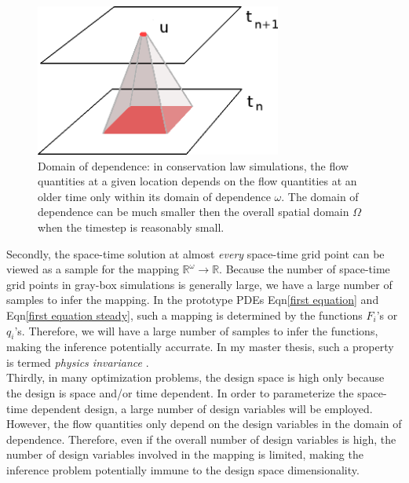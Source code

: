 \documentclass[a4paper,onecolumn]{article}
\theoremstyle{remark}
\begin{document}
\begin{figure}[H]\begin{center}
    \includegraphics[height=5cm]{locality.png}
    \caption{Domain of dependence: in conservation law simulations,
             the flow quantities at a given location
             depends on the flow quantities at an older time only within its
             domain of dependence $\omega$. The domain of dependence can be much smaller
             then the overall spatial domain $\Omega$ when the timestep is reasonably small.}
    \label{locality}
\end{center}\end{figure}

\noindent Secondly, the space-time solution at almost \emph{every} space-time grid point can be viewed
as a sample for the mapping $\mathbb{R}^\omega \rightarrow \mathbb{R}$. 
Because the number of space-time grid points in gray-box simulations is generally large,
we have a large number of samples to infer the mapping. 
In the prototype PDEs Eqn\eqref{first equation} and Eqn\eqref{first equation steady},
such a mapping is determined by the functions $F_i$'s or $q_i$'s.
Therefore, we will have a large number of samples to infer the functions,
making the inference potentially accurrate.
In my master thesis,
such a property is termed \emph{physics invariance} \cite{hanmaster}.\\

\noindent Thirdly, in many optimization problems, the design space is high only because
the design is space and/or time dependent. In order to parameterize the space-time dependent
design, a large number of design variables will be employed. However, 
the flow quantities only depend on the design variables in the domain of dependence.
Therefore, even if the overall number of design variables is high, the number of design variables
involved in the mapping is limited, making the inference problem potentially
immune to the design space dimensionality.\\
\end{document}
